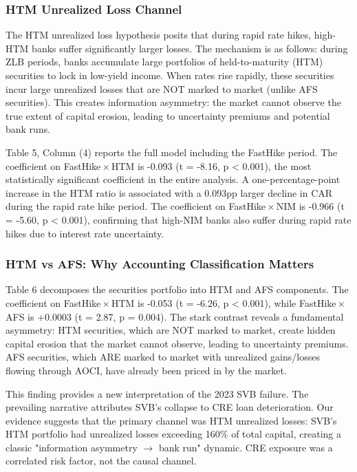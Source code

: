 \documentclass[12pt,a4paper]{article}
\begin{document}
\subsubsection{HTM Unrealized Loss Channel}

The HTM unrealized loss hypothesis posits that during rapid rate hikes, high-HTM banks suffer significantly larger losses. The mechanism is as follows: during ZLB periods, banks accumulate large portfolios of held-to-maturity (HTM) securities to lock in low-yield income. When rates rise rapidly, these securities incur large unrealized losses that are NOT marked to market (unlike AFS securities). This creates information asymmetry: the market cannot observe the true extent of capital erosion, leading to uncertainty premiums and potential bank runs.

Table 5, Column (4) reports the full model including the FastHike period. The coefficient on FastHike\,$\times$\,HTM is -0.093 (t = -8.16, p < 0.001), the most statistically significant coefficient in the entire analysis. A one-percentage-point increase in the HTM ratio is associated with a 0.093pp larger decline in CAR during the rapid rate hike period. The coefficient on FastHike\,$\times$\,NIM is -0.966 (t = -5.60, p < 0.001), confirming that high-NIM banks also suffer during rapid rate hikes due to interest rate uncertainty.

\subsubsection{HTM vs AFS: Why Accounting Classification Matters}

Table 6 decomposes the securities portfolio into HTM and AFS components. The coefficient on FastHike\,$\times$\,HTM is -0.053 (t = -6.26, p < 0.001), while FastHike\,$\times$\,AFS is +0.0003 (t = 2.87, p = 0.004). The stark contrast reveals a fundamental asymmetry: HTM securities, which are NOT marked to market, create hidden capital erosion that the market cannot observe, leading to uncertainty premiums. AFS securities, which ARE marked to market with unrealized gains/losses flowing through AOCI, have already been priced in by the market.

This finding provides a new interpretation of the 2023 SVB failure. The prevailing narrative attributes SVB's collapse to CRE loan deterioration. Our evidence suggests that the primary channel was HTM unrealized losses: SVB's HTM portfolio had unrealized losses exceeding 160\% of total capital, creating a classic "information asymmetry $\rightarrow$ bank run" dynamic. CRE exposure was a correlated risk factor, not the causal channel.
\end{document}
